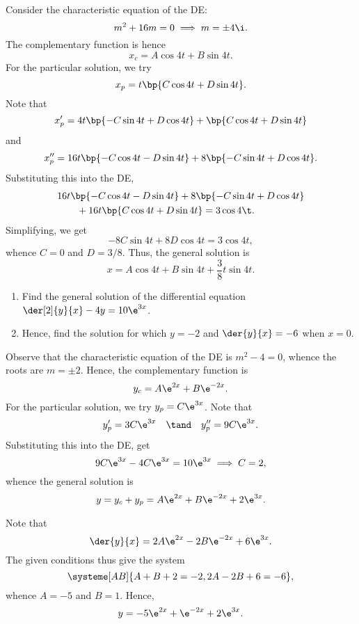 \begin{solution}
\begin{ppart}
    \end{ppart}
    \begin{ppart}
        Consider the characteristic equation of the DE: \[m^2 + 16m = 0 \implies m = \pm 4 \i.\] The complementary function is hence \[x_c = A\cos 4t + B \sin 4t.\] For the particular solution, we try \[x_p = t\bp{C\cos 4t + D \sin 4t}.\] Note that \[x_p' = 4t\bp{-C\sin 4t + D\cos 4t} + \bp{C \cos 4t + D \sin 4t}\] and \[x_p'' = 16t\bp{-C\cos 4t - D\sin 4t} + 8\bp{-C\sin 4t + D \cos 4t}.\] Substituting this into the DE, 
        \begin{align*}
            &16t\bp{-C\cos 4t - D\sin 4t} + 8\bp{-C\sin 4t + D \cos 4t}\\
            &\hspace{2em}+ 16t\bp{C\cos 4t + D \sin 4t} = 3\cos 4\t.
        \end{align*}
        Simplifying, we get \[-8C \sin 4t + 8D \cos 4t = 3\cos 4t,\] whence $C = 0$ and $D = 3/8$. Thus, the general solution is \[x = A\cos4t + B \sin 4t + \frac38 t\sin 4t.\]
    \end{ppart}
\end{solution}

\begin{problem}
    \begin{enumerate}
        \item Find the general solution of the differential equation $\der[2]{y}{x} - 4y = 10 \e^{3x}$.
        \item Hence, find the solution for which $y = -2$ and $\der{y}{x} = -6$ when $x = 0$.
    \end{enumerate}
\end{problem}
\begin{solution}
    \begin{ppart}
        Observe that the characteristic equation of the DE is $m^2 -4 = 0$, whence the roots are $m = \pm 2$. Hence, the complementary function is \[y_c = A\e^{2x} + B\e^{-2x}.\] For the particular solution, we try $y_p = C\e^{3x}$. Note that \[y_p' = 3C\e^{3x} \quad \tand \quad y_p'' = 9C\e^{3x}.\] Substituting this into the DE, get \[9C\e^{3x} - 4C\e^{3x} = 10\e^{3x} \implies C = 2,\] whence the general solution is \[y = y_c + y_p = A\e^{2x} + B\e^{-2x} + 2\e^{3x}.\]
    \end{ppart}
    \begin{ppart}
        Note that \[\der{y}{x} = 2A\e^{2x} - 2B\e^{-2x} + 6\e^{3x}.\] The given conditions thus give the system \[\systeme[AB]{A + B + 2= -2, 2A - 2B + 6 = -6},\] whence $A = -5$ and $B = 1$. Hence, \[y = -5\e^{2x} + \e^{-2x} + 2\e^{3x}.\]
    \end{ppart}
\end{solution}

